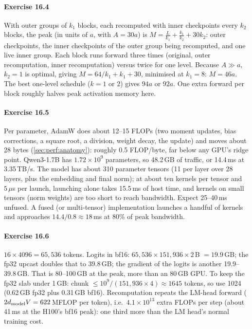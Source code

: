 \paragraph{Exercise 16.4} With outer groups of $k_1$ blocks, each recomputed with inner checkpoints
every $k_2$ blocks, the peak (in units of $a$, with $A=30a$) is
$M=\tfrac{L}{k_1}+\tfrac{k_1}{k_2}+30k_2$: outer checkpoints, the inner checkpoints of the outer
group being recomputed, and one live inner group. Each block runs forward three times (original,
outer recomputation, inner recomputation) versus twice for one level. Because $A\gg a$, $k_2=1$ is
optimal, giving $M=64/k_1+k_1+30$, minimised at $k_1=8$: $M=46a$. The best one-level schedule
($k=1$ or $2$) gives $94a$ or $92a$. One extra forward per block roughly halves peak activation
memory here.

\paragraph{Exercise 16.5} Per parameter, AdamW does about 12--15 FLOPs (two moment updates, bias
corrections, a square root, a division, weight decay, the update) and moves about 28 bytes
(\cref{sec:perf:anatomy}): roughly 0.5 FLOP/byte, far below any GPU's ridge point. Qwen3-1.7B has
$1.72\times10^9$ parameters, so 48.2\,GB of traffic, or 14.4\,ms at 3.35\,TB/s. The model has about
310 parameter tensors (11 per layer over 28 layers, plus the embedding and final norm); at about
ten kernels per tensor and $5\,\mu$s per launch, launching alone takes 15.5\,ms of host time, and
kernels on small tensors (norm weights) are too short to reach bandwidth. Expect 25--40\,ms unfused.
A fused (or multi-tensor) implementation launches a handful of kernels and approaches
$14.4/0.8\approx18$\,ms at 80\% of peak bandwidth.

\paragraph{Exercise 16.6} $16\times4096=65{,}536$ tokens. Logits in bf16: $65{,}536\times151{,}936\times2$\,B
$=19.9$\,GB; the fp32 upcast doubles that to 39.8\,GB; the gradient of the logits is another
19.9--39.8\,GB. That is 80--100\,GB at the peak, more than an 80\,GB GPU. To keep the fp32 slab under
1\,GB: chunk $\le 10^9/(151{,}936\times4)\approx1645$ tokens, so use 1024 (0.62\,GB fp32 plus 0.31\,GB
bf16). Recomputation repeats the LM-head forward ($2d_{\text{model}} V=622$\,MFLOP per token), i.e.\
$4.1\times10^{13}$ extra FLOPs per step (about 41\,ms at the H100's bf16 peak): one third more than the
LM head's normal training cost.

